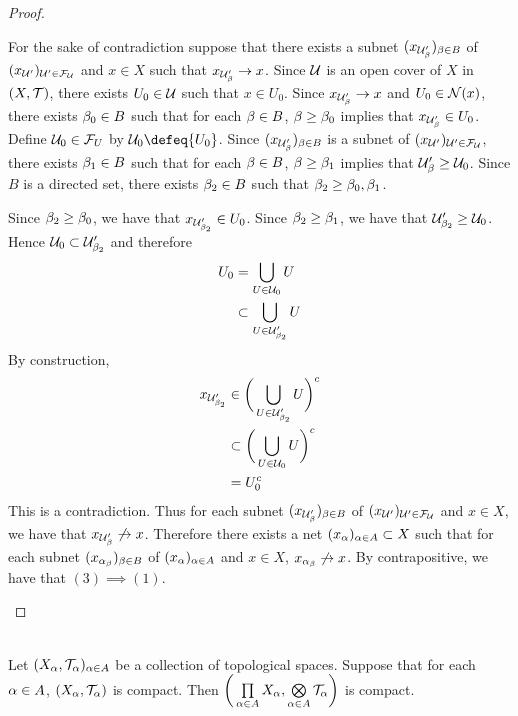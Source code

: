 \documentclass{book}
\begin{document}
\begin{proof}
\begin{itemize}
			For the sake of contradiction suppose that there exists a subnet $(x_{\mathcal{U}'_{\beta}})_{\beta \in B}$ of $(x_{\mathcal{U}'})_{\mathcal{U}' \in \mathcal{F}_{\mathcal{U}}}$ and $x \in X$ such that $x_{\mathcal{U}'_{\beta}} \rightarrow x$. Since $\mathcal{U}$ is an open cover of $X$ in $(X, \mathcal{T})$, there exists $U_0 \in \mathcal{U}$ such that $x \in U_0$. Since $x_{\mathcal{U}'_{\beta}} \rightarrow x$ and $U_0 \in \mathcal{N}(x)$, there exists $\beta_0 \in B$ such that for each $\beta \in B$, $\beta \geq \beta_0$ implies that $x_{\mathcal{U}'_{\beta}} \in U_0$. Define $\mathcal{U}_0 \in \mathcal{F}_{U}$ by $\MU_0 \defeq \{U_0\}$. Since $(x_{\mathcal{U}'_{\beta}})_{\beta \in B}$ is a subnet of $(x_{\mathcal{U}'})_{\mathcal{U}' \in \mathcal{F}_{\mathcal{U}}}$, there exists $\beta_1 \in B$ such that for each $\beta \in B$, $\beta \geq \beta_1$ implies that $\mathcal{U}'_{\beta} \geq \mathcal{U}_0$. Since $B$ is a directed set, there exists $\beta_2 \in B$ such that $\beta_2 \geq \beta_0, \beta_1$. 
			
			Since $\beta_2 \geq \beta_0$, we have that $x_{\mathcal{U}'_{\beta_2}} \in U_0$. Since $\beta_2 \geq \beta_1$, we have that $\mathcal{U}'_{\beta_2} \geq \mathcal{U}_0$. Hence $\mathcal{U}_0 \subset \mathcal{U}'_{\beta_2}$ and therefore 
			\begin{align*}
				U_0 
				& = \bigcup\limits_{U \in \mathcal{U}_0} U \\
				& \subset \bigcup\limits_{U \in \mathcal{U}'_{\beta_2}} U
			\end{align*}
			By construction,
			\begin{align*}
				x_{\mathcal{U}'_{\beta_2}} 
				& \in \bigg( \bigcup_{U \in \mathcal{U}'_{\beta_2}} U \bigg)^c \\
				& \subset \bigg( \bigcup_{U \in \mathcal{U}_0} U \bigg)^c \\
				& = U_0^c 
			\end{align*}
			This is a contradiction. Thus for each subnet $(x_{\mathcal{U}'_{\beta}})_{\beta \in B}$ of $(x_{\mathcal{U}'})_{\mathcal{U}' \in \mathcal{F}_{\mathcal{U}}}$ and $x \in X$, we have that $x_{\mathcal{U}'_{\beta}} \not \rightarrow x$. Therefore there exists a net $(x_{\alpha})_{\alpha \in A} \subset X$ such that for each subnet $(x_{\alpha_{\beta}})_{\beta \in B}$ of $(x_{\alpha})_{\alpha \in A}$ and $x \in X$, $x_{\alpha_{\beta}} \not \rightarrow x$. By contrapositive, we have that $(3) \implies (1)$.
		\end{itemize}
	\end{proof}
	
	\begin{ex}  \\
		Let $(X_{\alpha}, \mathcal{T}_{\alpha})_{\alpha \in A}$ be a collection of topological spaces. Suppose that for each $\alpha \in A$, $(X_{\alpha} , \mathcal{T}_{\alpha})$ is compact. Then $\bigg( \prod\limits_{\alpha \in A} X_{\alpha}, \bigotimes\limits_{\alpha \in A} \mathcal{T}_{\alpha} \bigg)$ is compact. \\
	\end{ex}
\end{document}
